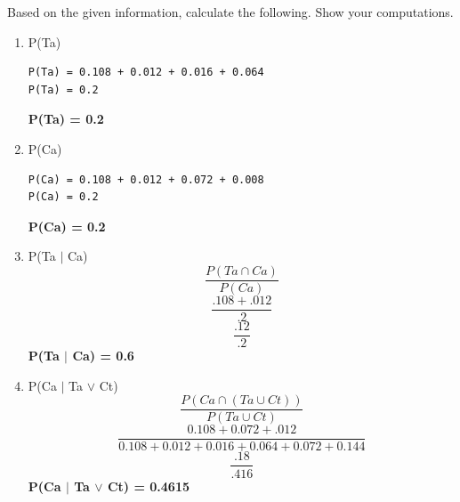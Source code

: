 \documentclass[fontsize=10pt]{scrartcl}
\begin{document}
	Based on the given information, calculate the following. Show your computations.

	\begin{enumerate}
		\item
		P(Ta) \\
\begin{verbatim}
P(Ta) = 0.108 + 0.012 + 0.016 + 0.064
P(Ta) = 0.2
\end{verbatim}
		\textbf{P(Ta) = 0.2}

		\item
		P(Ca) \\
\begin{verbatim}
P(Ca) = 0.108 + 0.012 + 0.072 + 0.008
P(Ca) = 0.2
\end{verbatim}
		\textbf{P(Ca) = 0.2}
		\item
		P(Ta $\vert$ Ca) \\
		\begin{equation*}
			\frac{P(Ta \cap Ca)}{P(Ca)}
		\end{equation*}
		\begin{equation*}
			\frac{.108 + .012}{.2}
		\end{equation*}
		\begin{equation*}
			\frac{.12}{.2}
		\end{equation*}
		\textbf{P(Ta $\vert$ Ca) = 0.6}

		\item
		P(Ca $\vert$ Ta $\vee$ Ct)
		\begin{equation*}
			\frac{P(Ca \cap (Ta \cup Ct))}{P(Ta \cup Ct)}
		\end{equation*}
		\begin{equation*}
			\frac{0.108 + 0.072 + .012}{0.108 + 0.012 + 0.016 + 0.064 + 0.072 + 0.144}
		\end{equation*}
		\begin{equation*}
			\frac{.18}{.416}
		\end{equation*}
		\textbf{P(Ca $\vert$ Ta $\vee$ Ct) = 0.4615}
	\end{enumerate}
\end{document}
